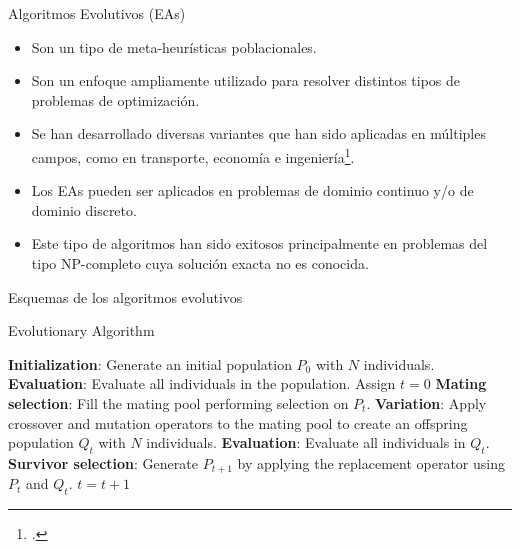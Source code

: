 \documentclass{beamer}
\begin{document}
\begin{frame}{Algoritmos Evolutivos (EAs)}
    \begin{itemize}
       \item Son un tipo de meta-heurísticas poblacionales.
        \item Son un enfoque ampliamente utilizado para resolver distintos tipos de problemas de optimización.
        
        \item Se han desarrollado diversas variantes que han sido aplicadas en múltiples campos, como en transporte, economía e ingeniería\footcite{dasgupta2013evolutionary}.
        
        \item Los EAs pueden ser aplicados en problemas de dominio continuo y/o de dominio discreto.
        
        \item Este tipo de algoritmos han sido exitosos principalmente en problemas del tipo NP-completo cuya solución exacta no es conocida.
    \end{itemize}{}
\end{frame}

\begin{frame}{Esquemas de los algoritmos evolutivos}
  \begin{algorithm}[H]
  \begin{scriptsize}
\caption{Evolutionary Algorithm} 
\begin{algorithmic}[1]
 	\STATE \textbf{Initialization}: Generate an initial population $P_0$ with $N$ individuals.
	\STATE \textbf{Evaluation}: Evaluate all individuals in the population.
	\STATE Assign $t=0$
	   \STATE \textbf{Mating selection}: Fill the mating pool performing selection on $P_t$.
	   \STATE \textbf{Variation}: Apply crossover and mutation operators to the mating pool to create an offspring population $Q_t$ with $N$ individuals.
		 \STATE \textbf{Evaluation}: Evaluate all individuals in $Q_t$.
	   \STATE \textbf{Survivor selection}: Generate $P_{t+1}$ by applying the replacement operator using $P_t$ and $Q_t$.
	   \STATE $t=t+1$
	\ENDWHILE
	\end{algorithmic}

\end{scriptsize}
\end{algorithm}
\end{frame}
\end{document}
